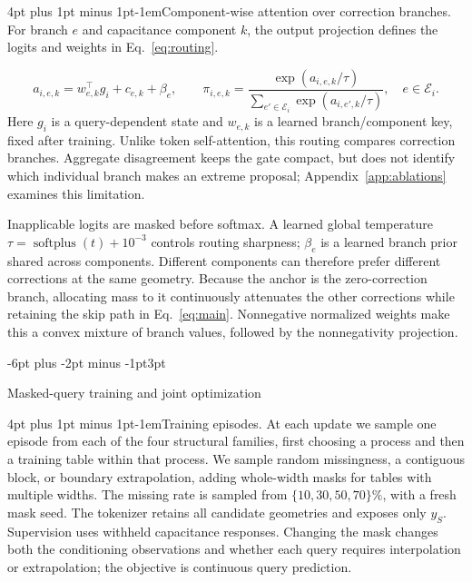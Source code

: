 \documentclass{article}
\makeatletter
\renewcommand{\subsection}{\@startsection{subsection}{2}{\z@}
  {-6pt plus -2pt minus -1pt}{3pt}{\normalsize\sc\raggedright}}
\renewcommand{\paragraph}{\@startsection{paragraph}{4}{\z@}
  {4pt plus 1pt minus 1pt}{-1em}{\normalsize\bf}}
\makeatother
\begin{document}
\paragraph{Component-wise attention over correction branches.}
For branch $e$ and capacitance component $k$, the output projection defines
the logits and weights in Eq.~\eqref{eq:routing}.

\begin{equation}
\label{eq:routing}
 a_{i,e,k}=w_{e,k}^{\top}g_i+c_{e,k}+\beta_e,\qquad
 \pi_{i,e,k}=\frac{\exp(a_{i,e,k}/\tau)}
 {\sum_{e'\in\mathcal{E}_i}\exp(a_{i,e',k}/\tau)},\quad e\in\mathcal{E}_i.
\end{equation}
Here $g_i$ is a query-dependent state and $w_{e,k}$ is a learned
branch/component key, fixed after training. Unlike token self-attention, this
routing compares correction branches. Aggregate disagreement keeps the gate
compact, but does not identify which individual branch makes an extreme
proposal; Appendix~\ref{app:ablations} examines this limitation.

Inapplicable logits are masked before softmax. A learned global temperature
$\tau=\operatorname{softplus}(t)+10^{-3}$ controls routing sharpness;
$\beta_e$ is a learned branch prior shared across components.
Different components can therefore prefer different corrections at the same
geometry. Because the anchor is the zero-correction branch, allocating mass to
it continuously attenuates the other corrections while retaining the skip path
in Eq.~\eqref{eq:main}. Nonnegative normalized weights make this a convex
mixture of branch values, followed by the nonnegativity projection.

\subsection{Masked-query training and joint optimization}
\label{sec:training}

\paragraph{Training episodes.}
At each update we sample one episode from each of the four structural families,
first choosing a process and then a training table within that process. We
sample random missingness, a contiguous block, or boundary extrapolation,
adding whole-width masks for tables with multiple widths. The missing rate is
sampled from $\{10,30,50,70\}\%$, with a fresh mask seed.
The tokenizer retains all candidate geometries and exposes only $y_S$.
Supervision uses withheld capacitance responses. Changing the mask changes
both the conditioning observations and whether each query requires interpolation
or extrapolation; the objective is continuous query prediction.
\end{document}
